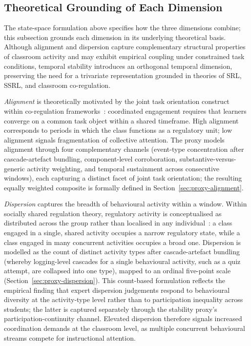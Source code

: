 \documentclass[preprint,12pt,authoryear]{elsarticle}
\begin{document}
\subsection{Theoretical Grounding of Each Dimension}
\label{sec:framework_grounding}

The state-space formulation above specifies how the three dimensions combine; this subsection grounds each dimension in its underlying theoretical basis. Although alignment and dispersion capture complementary structural properties of classroom activity and may exhibit empirical coupling under constrained task conditions, temporal stability introduces an orthogonal temporal dimension, preserving the need for a trivariate representation grounded in theories of SRL, SSRL, and classroom co-regulation.

\textit{Alignment} is theoretically motivated by the joint task orientation construct within co-regulation frameworks~\citep{hadwin2018, malmberg2017}: coordinated engagement requires that learners converge on a common task object within a shared timeframe. High alignment corresponds to periods in which the class functions as a regulatory unit; low alignment signals fragmentation of collective attention. The proxy models alignment through four complementary channels (event-type concentration after cascade-artefact bundling, component-level corroboration, substantive-versus-generic activity weighting, and temporal sustainment across consecutive windows), each capturing a distinct facet of joint task orientation; the resulting equally weighted composite is formally defined in Section~\ref{sec:proxy-alignment}.

\textit{Dispersion} captures the breadth of behavioural activity within a window. Within socially shared regulation theory, regulatory activity is conceptualised as distributed across the group rather than localised in any individual~\citep{hadwin2018, jarvela2021}: a class engaged in a single, shared activity occupies a narrow regulatory state, while a class engaged in many concurrent activities occupies a broad one. Dispersion is modelled as the count of distinct activity types after cascade-artefact bundling (whereby logging-level cascades for a single behavioural activity, such as a quiz attempt, are collapsed into one type), mapped to an ordinal five-point scale (Section~\ref{sec:proxy-dispersion}). This count-based formulation reflects the empirical finding that expert dispersion judgements respond to behavioural diversity at the activity-type level rather than to participation inequality across students; the latter is captured separately through the stability proxy's participation-continuity channel. Elevated dispersion therefore signals increased coordination demands at the classroom level, as multiple concurrent behavioural streams compete for instructional attention.
\end{document}
